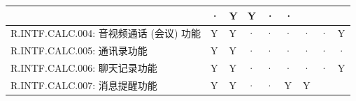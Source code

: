 \begin{table}[htbp]
\begin{tabular}{|p{9em}|p{2.5em}|p{2.5em}|p{2.5em}|p{2.5em}|p{2.5em}|
                            p{2.5em}|p{2.5em}|p{2.5em}|}
                & ·                     & Y                 & Y 
                & ·                     & ·                 \\
            \hline %
            R.INTF.CALC.004: 音视频通话 (会议) 功能
                & Y                     & Y                 & · 
                & ·                     & ·                 & · 
                & ·                     & Y                 \\
            \hline %
            R.INTF.CALC.005: 通讯录功能
                & Y                     & Y                 & · 
                & ·                     & ·                 & · 
                & ·                     & ·                 \\
            \hline %
            R.INTF.CALC.006: 聊天记录功能
                & Y                     & Y                 & · 
                & ·                     & ·                 & · 
                & ·                     & Y                 \\
            \hline %
            R.INTF.CALC.007: 消息提醒功能
                & Y                     & Y                 & · 
                & ·                     & Y                 & Y 

\end{tabular}
\end{table}
